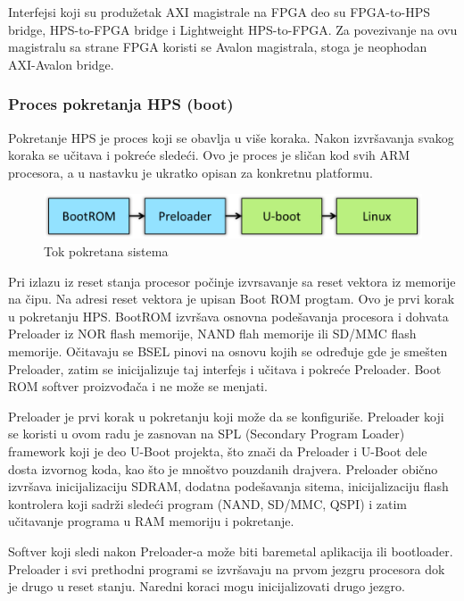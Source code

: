 Interfejsi koji su produžetak AXI magistrale na FPGA deo su FPGA-to-HPS bridge, HPS-to-FPGA bridge i Lightweight HPS-to-FPGA. Za povezivanje na ovu magistralu sa strane FPGA koristi se Avalon magistrala, stoga je neophodan AXI-Avalon bridge.

\subsubsection{Proces pokretanja HPS (boot)}
Pokretanje HPS je proces koji se obavlja u više koraka. Nakon izvršavanja svakog koraka se učitava i pokreće sledeći. Ovo je proces je sličan kod svih ARM procesora, a u nastavku je ukratko opisan za konkretnu platformu.

\begin{figure}[h!]
\centering
\includegraphics[scale=1.]{img/gsrd-boot.png}
\caption{Tok pokretana sistema}
\label{slika1:gsrd}
\end{figure}

Pri izlazu iz reset stanja procesor počinje izvrsavanje sa reset vektora iz memorije na čipu. Na adresi reset vektora je upisan Boot ROM progtam. Ovo je prvi korak u pokretanju HPS. BootROM izvršava osnovna podešavanja procesora i dohvata Preloader iz NOR flash memorije, NAND flah memorije ili SD/MMC flash memorije. Očitavaju se BSEL pinovi na osnovu kojih se određuje gde je smešten Preloader, zatim se inicijalizuje taj interfejs i učitava i pokreće Preloader. Boot ROM softver proizvođača i ne može se menjati. 

Preloader je prvi korak u pokretanju koji može da se konfiguriše. Preloader koji se koristi u ovom radu je zasnovan na SPL (Secondary Program Loader) framework koji je deo U-Boot projekta, što znači da Preloader i U-Boot dele dosta izvornog koda, kao što je mnoštvo pouzdanih drajvera. Preloader obično izvršava inicijalizaciju SDRAM, dodatna podešavanja sitema, inicijalizaciju flash kontrolera koji sadrži sledeći program (NAND, SD/MMC, QSPI) i zatim učitavanje programa u RAM memoriju i pokretanje.

Softver koji sledi nakon Preloader-a može biti baremetal aplikacija ili bootloader. Preloader i svi prethodni programi se izvršavaju na prvom jezgru procesora dok je drugo u reset stanju. Naredni koraci mogu inicijalizovati drugo jezgro.

